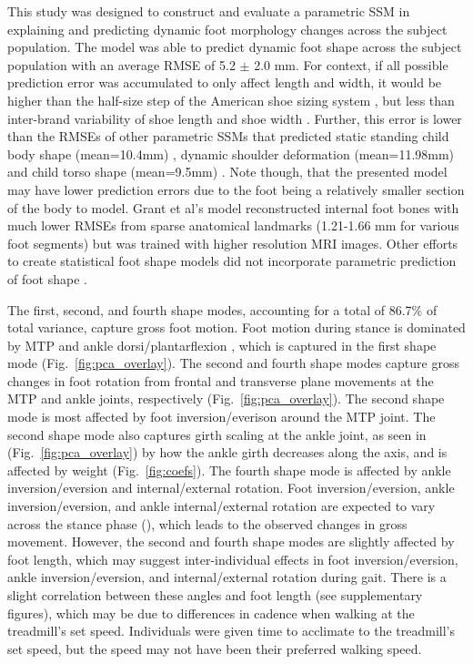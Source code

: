 \documentclass[preprint]{elsarticle}
\begin{document}
This study was designed to construct and evaluate a parametric SSM in explaining and predicting dynamic foot morphology changes across the subject population.
The model was able to predict dynamic foot shape across the subject population with an average RMSE of 5.2 \(\pm\) 2.0 mm. For context, if all possible prediction error was accumulated to only affect length and width, it would be higher than the half-size step of the American shoe sizing system \citep{Luximon2013}, but less than inter-brand variability of shoe length and shoe width \citep{Wannop2019}.
Further, this error is lower than the RMSEs of other parametric SSMs that predicted static standing child body shape (mean=10.4mm) \citep{Park2015a}, dynamic shoulder deformation (mean=11.98mm) \citep{KIM2016} and child torso shape (mean=9.5mm) \citep{Park2017}. Note though, that the presented model may have lower prediction errors due to the foot being a relatively smaller section of the body to model. Grant et al's model reconstructed internal foot bones with much lower RMSEs from sparse anatomical landmarks (1.21-1.66 mm for various foot segments) \citep{Grant2020} but was trained with higher resolution MRI images. Other efforts to create statistical foot shape models did not incorporate parametric prediction of foot shape \citep{Conrad2019, Stankovic2020}.

The first, second, and fourth shape modes, accounting for a total of 86.7\% of total variance, capture gross foot motion.
Foot motion during stance is dominated by MTP and ankle dorsi/plantarflexion \citep{Leardini2007}, which is captured in the first shape mode (Fig.~\ref{fig:pca_overlay}).
The second and fourth shape modes capture gross changes in foot rotation from frontal and transverse plane movements at the MTP and ankle joints, respectively (Fig.~\ref{fig:pca_overlay}).
The second shape mode is most affected by foot inversion/everison around the MTP joint.
The second shape mode also captures girth scaling at the ankle joint, as seen in (Fig.~\ref{fig:pca_overlay}) by how the ankle girth decreases along the axis, and is affected by weight (Fig.~\ref{fig:coefs}).
The fourth shape mode is affected by ankle inversion/eversion and internal/external rotation.
Foot inversion/eversion, ankle inversion/eversion, and ankle internal/external rotation are expected to vary across the stance phase (\citep{Leardini2007}), which leads to the observed changes in gross movement.
However, the second and fourth shape modes are slightly affected by foot length, which may suggest inter-individual effects in foot inversion/eversion, ankle inversion/eversion, and internal/external rotation during gait.
There is a slight correlation between these angles and foot length (see supplementary figures), which may be due to differences in cadence when walking at the treadmill's set speed.
Individuals were given time to acclimate to the treadmill's set speed, but the speed may not have been their preferred walking speed.
\end{document}

